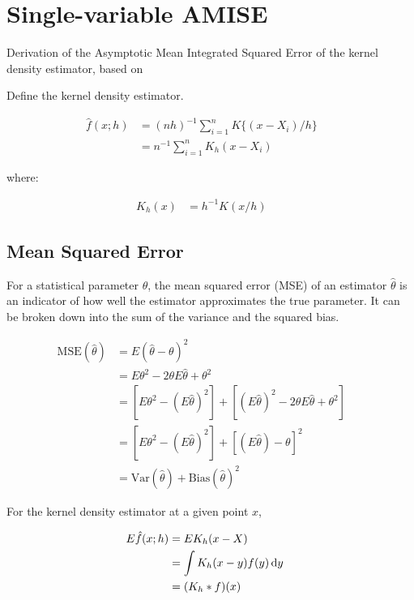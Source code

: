 
\section{Single-variable AMISE}

Derivation of the Asymptotic Mean Integrated Squared Error of the kernel density estimator, based on \citep{wand1994kernel}

Define the kernel density estimator.

\begin{align}
    \hat{f}(x;h) & = (nh)^{-1} \sum_{i=1}^{n}{K\{(x-X_i)/h\}} && \\
        & = n^{-1} \sum_{i=1}^n{K_h(x-X_i)} &&
\end{align}

where:

\begin{align}
K_h(x) & = h^{-1} K(x/h) &&
\end{align}

\subsection{Mean Squared Error}

For a statistical parameter $\theta$, the mean squared error (MSE) of an estimator $\hat{\theta}$ is an indicator of how well the estimator approximates the true parameter.
It can be broken down into the sum of the variance and the squared bias.

\begin{align}
    \mbox{MSE}(\hat{\theta}) & =  E(\hat{\theta} - \theta)^2 && \nonumber \\
                & = E\theta^2 - 2\theta E\hat{\theta} + \theta^2 && \nonumber \\
                & = [E\theta^2 - (E\hat{\theta})^2] + [(E\hat{\theta})^2 - 2\theta E\hat{\theta} + \theta^2] && \nonumber \\
                & = [E\theta^2 - (E\hat{\theta})^2] + [(E\hat{\theta}) - \theta]^2 && \nonumber \\
                & = \mbox{Var}(\hat{\theta}) + \mbox{Bias}(\hat{\theta})^2
\end{align}

For the kernel density estimator at a given point $x$,

\begin{align}
    E\hat{f}(x;h) & = E K_h(x-X) && \nonumber \\
        & = \int{K_h(x-y)f(y)\,\mathrm{d}y} && \nonumber \\
        & = (K_h \ast f)(x) \label{eq:E_f_hat} &&
\end{align}

